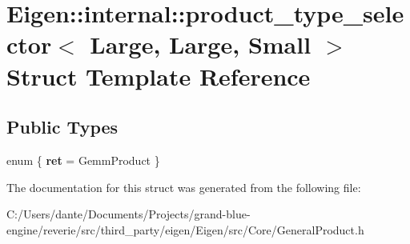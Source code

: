 \hypertarget{struct_eigen_1_1internal_1_1product__type__selector_3_01_large_00_01_large_00_01_small_01_4}{}\section{Eigen\+::internal\+::product\+\_\+type\+\_\+selector$<$ Large, Large, Small $>$ Struct Template Reference}
\label{struct_eigen_1_1internal_1_1product__type__selector_3_01_large_00_01_large_00_01_small_01_4}
\subsection*{Public Types}
\begin{DoxyCompactItemize}
\item 
\mbox{\label{struct_eigen_1_1internal_1_1product__type__selector_3_01_large_00_01_large_00_01_small_01_4_ade122aef0bf6b01447c7dd614ffb701d}} 
enum \{ {\bfseries ret} = Gemm\+Product
 \}
\end{DoxyCompactItemize}


The documentation for this struct was generated from the following file\+:\begin{DoxyCompactItemize}
\item 
C\+:/\+Users/dante/\+Documents/\+Projects/grand-\/blue-\/engine/reverie/src/third\+\_\+party/eigen/\+Eigen/src/\+Core/General\+Product.\+h\end{DoxyCompactItemize}
